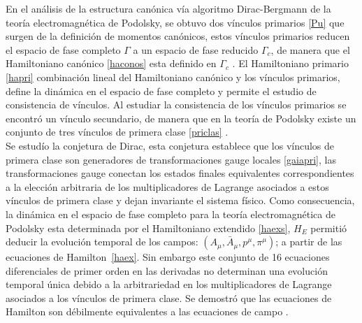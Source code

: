 \documentclass[a4paper,12pt]{article}
\begin{document}
En el análisis de la estructura canónica vía algoritmo Dirac-Bergmann de la teoría electromagnética de Podolsky, se obtuvo dos vínculos primarios \eqref{Pu} que surgen de la definición de momentos canónicos, estos vínculos primarios reducen el espacio de fase completo $\Gamma$ a un espacio de fase reducido $\Gamma_c$, de manera que el Hamiltoniano canónico \eqref{haconos} esta definido en $\Gamma_c$ \cite{podolsky}. El Hamiltoniano primario \eqref{hapri} combinación lineal del Hamiltoniano canónico y los vínculos primarios, define la dinámica en el espacio de fase completo y permite el estudio de consistencia de vínculos. Al estudiar la consistencia de los vínculos primarios se encontró un vínculo secundario, de manera que en la teoría de Podolsky existe un conjunto de tres vínculos de primera clase \eqref{priclas} \cite{podolsky}. 
\\

Se estudío la conjetura de Dirac, esta conjetura establece que los vínculos de primera clase son \mbox{generadores} de transformaciones gauge locales \eqref{gaiapri}, las \mbox{transformaciones} gauge conectan los estados finales \mbox{equivalentes} correspondientes a la elección \mbox{arbitraria} de los multiplicadores de Lagrange \mbox{asociados} a estos vínculos de primera clase y dejan invariante el sistema físico. Como consecuencia, la dinámica en el \mbox{espacio} de fase completo para la teoría electromagnética de Podolsky esta \mbox{determinada} por el Hamiltoniano extendido \eqref{haexs}, $H_E$ permitió deducir la evolución temporal de los campos: \mbox{$(A_\mu,\bar{A}_\mu,p^\mu,\pi^\mu)$}; a partir de las ecuaciones de \mbox{Hamilton \eqref{haex}.} Sin embargo este conjunto de 16 ecuaciones diferenciales de primer orden en las derivadas no determinan una evolución temporal única debido a la arbitrariedad en los multiplicadores de Lagrange asociados a los vínculos de primera clase. Se demostró que las ecuaciones de Hamilton son débilmente equivalentes a las ecuaciones de campo \cite{podolsky}.
\\
\end{document}
